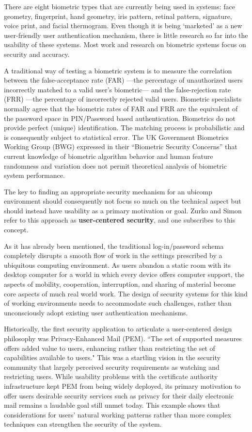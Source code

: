 \documentclass{article}
\begin{document}
There are eight biometric types that are currently being used in systems: face geometry, fingerprint, hand geometry, iris pattern, retinal pattern, signature, voice print, and facial thermogram. Even though it is being `marketed' as a new user-friendly user authentication mechanism, there is little research so far into the usability of these systems. Most work and research on biometric systems focus on security and accuracy. 

A traditional way of testing a biometric system is to measure the correlation between the false-acceptance rate (FAR) ---the percentage of unauthorized users incorrectly matched to a valid user's biometric--- and the false-rejection rate (FRR) ---the percentage of incorrectly rejected valid users. Biometric specialists normally agree that the biometric rates of FAR and FRR are the equivalent of the password space in PIN/Password based authentication.\cite{biometrics2003biometrics} Biometrics do not provide perfect (unique) identification. The matching process is probabilistic and is consequently subject to statistical error.    The UK Government Biometrics Working Group (BWG) expressed in their “Biometric Security Concerns” that current knowledge of biometric algorithm behavior and human feature randomness and variation does not permit theoretical analysis of biometric system performance. \cite{biometrics2003biometrics}

The key to finding an appropriate security mechanism for an ubicomp environment should consequently not focus so much on the technical aspect but should instead have usability as a primary motivation or goal.  Zurko and Simon \cite{zurko1996user} refer to this approach as \textbf{user-centered security}, and one subscribes to this concept. 

As it has already been mentioned, the traditional log-in/password schema completely disrupts a smooth flow of work in the settings prescribed by a ubiquitous computing environment. As users abandon a static room with its desktop computer for a world in which every device offers computer support, the aspects of mobility, cooperation, interruption, and sharing of material become core aspects of much real world work. The design of security systems for this kind of working environments needs to accommodate such challenges, rather than unconsciously adopt existing user authentication mechanisms.

Historically, the first security application to articulate a user-centered design philosophy was Privacy-Enhanced Mail (PEM).\cite{linn1993privacy} ``The set of supported measures offers added value to users, enhancing rather than restricting the set of capabilities available to users." This was a startling vision in the security community that largely perceived security requirements as watching and restricting users. While usability problems with the certificate authority infrastructure kept PEM from being widely deployed, its primary motivation to offer users desirable security services such as privacy for their daily electronic mail remains a laudable goal still  unmet today.\cite{zurko1996user}  This example shows that considerations for users' natural working patterns rather than more complex techniques can strengthen the security of the system.
\end{document}
